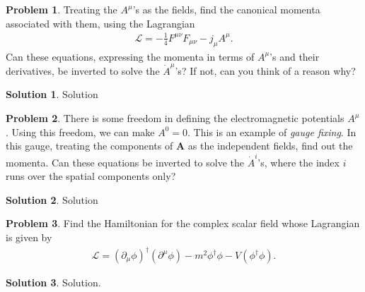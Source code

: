 \documentclass[a4paper,11pt]{article}
\numberwithin{equation}{section}
\theoremstyle{definition}
\newtheorem{prob}{Problem}[section]
\newtheorem{sln}{Solution}[section]
\newcommand{\p}{\partial}
\newcommand{\lag}{\mathcal{L}}
\begin{document}
\begin{prob}
	Treating the $A^\mu$'s as the fields, find the canonical momenta associated with them, using the Lagrangian 
	\begin{align}
	\lag = -\frac{1}{4}F^{\mu\nu}F_{\mu\nu} - j_\mu A^\mu.
	\end{align}
	Can these equations, expressing the momenta in terms of $A^\mu$'s and their derivatives, be inverted to solve the $\dot{A}^\mu$'s? If not, can you think of a reason why?\\
	
	\begin{sln}
		Solution
	\end{sln}
\end{prob}


\newpage




\begin{prob}
	There is some freedom in defining the electromagnetic potentials $A^\mu$. Using this freedom, we can make $A^0 = 0$. This is an example of \textit{gauge fixing}. In this gauge, treating the components of $\textbf{A}$ as the independent fields, find out the momenta. Can these equations be inverted to solve the $\dot{A}^i$'s, where the index $i$ runs over the spatial components only?\\
	
	\begin{sln}
		Solution
	\end{sln}
\end{prob}


\newpage



\begin{prob}
	Find the Hamiltonian for the complex scalar field whose Lagrangian is given by
	\begin{align}
	\lag = (\p_\mu\phi)^\dagger(\p^\mu\phi) - m^2\phi^\dagger\phi - V(\phi^\dagger\phi).
	\end{align}
	
	
	\begin{sln}
		Solution.
	\end{sln}
\end{prob}

\newpage
\end{document}
